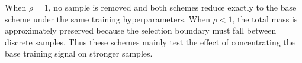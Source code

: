 \documentclass{article} %
\begin{document}
When $\rho=1$, no sample is removed and both schemes reduce exactly to the base scheme under the
same training hyperparameters.  When $\rho<1$, the
total mass is approximately preserved because the selection boundary
must fall between discrete samples.  Thus these schemes mainly test the
effect of concentrating the base training signal on stronger samples.







\end{document}
